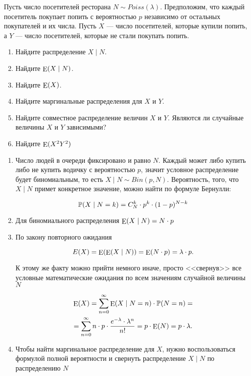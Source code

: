 \begin{problem}
Пусть число посетителей ресторана $N \sim Poiss(\lambda)$.  Предположим, что каждый посетитель покупает попить с вероятностью $p$ независимо от остальных покупателей и их числа. Пусть $X$ --- число посетителей, которые купили попить, а $Y$ --- число посетителей, которые не стали покупать попить.  

\begin{enumerate} 
\item Найдите распределение $X \mid N$.
\item Найдите $\operatorname{\mathop{E}}(X \mid N)$.
\item Найдите $\operatorname{\mathop{E}}(X)$.
\item Найдите маргинальные распределения для $X$ и $Y$.
\item Найдите совместное распределение величин $X$ и $Y$. Являются ли случайные величины $X$ и $Y$ зависимыми? 
\item Найдите $\operatorname{\mathop{E}}(X^2Y^2)$
\end{enumerate} 	

\begin{sol} 
\begin{enumerate}
	\item  Число людей в очереди фиксировано и равно $N$. Каждый может либо купить либо не купить водичку с вероятностью $p$, значит условное распределение будет биномиальным, то есть $X \mid N \sim Bin(p, N)$. Вероятность, того, что $X \mid N$ примет конкретное значение, можно найти по формуле Бернулли: 
	
	\[ \mathbb{P}(X \mid N = k) = C_{N}^k \cdot p^k \cdot (1-p)^{N-k} \] 
	
	\item  Для биномиального распределения $\operatorname{\mathop{E}}(X \mid N) = N \cdot p$ 
	\item  По закону повторного ожидания 
	
	\[ E(X) = \operatorname{\mathop{E}}(\operatorname{\mathop{E}}(X \mid N)) = \operatorname{\mathop{E}}(N \cdot p) = \lambda \cdot p. \]
	
	К этому же факту можно прийти немного иначе, просто <<свернув>> все условные математические ожидания по всем значениям случайной величины $N$ 
	
	\begin{multline*}
	\operatorname{\mathop{E}}(X) = \sum_{n=0}^{\infty} \operatorname{\mathop{E}}(X \mid N =n) \cdot \mathbb{P}(N = n) = \\ = \sum_{n=0}^{\infty} n\cdot p \cdot \frac{e^{-\lambda} \cdot \lambda^n}{n!} = p \cdot \operatorname{\mathop{E}}(N) = p \cdot \lambda.
	\end{multline*}
	
	\item Чтобы найти маргинальное распределение для $X$, нужно воспользоваться формулой полной вероятности и свернуть распределение $X  \mid  N$ по распределению $N$
	

\end{enumerate}
\end{sol}
\end{problem}
